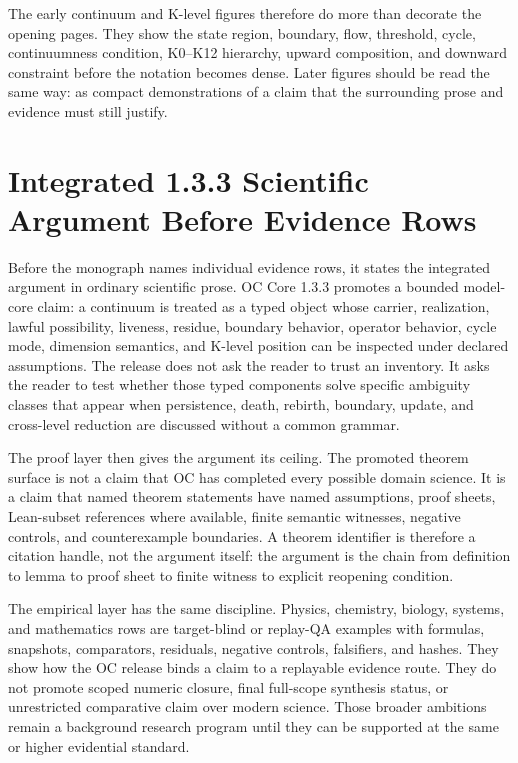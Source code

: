The early continuum and K-level figures therefore do more than decorate the opening pages. They show the state region, boundary, flow, threshold, cycle, continuumness condition, K0--K12 hierarchy, upward composition, and downward constraint before the notation becomes dense. Later figures should be read the same way: as compact demonstrations of a claim that the surrounding prose and evidence must still justify.


\section{Integrated 1.3.3 Scientific Argument Before Evidence Rows}
\label{sec:oc133-integrated-argument-before-evidence-rows}
Before the monograph names individual evidence rows, it states the integrated argument in ordinary scientific prose. OC Core 1.3.3 promotes a bounded model-core claim: a continuum is treated as a typed object whose carrier, realization, lawful possibility, liveness, residue, boundary behavior, operator behavior, cycle mode, dimension semantics, and K-level position can be inspected under declared assumptions. The release does not ask the reader to trust an inventory. It asks the reader to test whether those typed components solve specific ambiguity classes that appear when persistence, death, rebirth, boundary, update, and cross-level reduction are discussed without a common grammar.

The proof layer then gives the argument its ceiling. The promoted theorem surface is not a claim that OC has completed every possible domain science. It is a claim that named theorem statements have named assumptions, proof sheets, Lean-subset references where available, finite semantic witnesses, negative controls, and counterexample boundaries. A theorem identifier is therefore a citation handle, not the argument itself: the argument is the chain from definition to lemma to proof sheet to finite witness to explicit reopening condition.

The empirical layer has the same discipline. Physics, chemistry, biology, systems, and mathematics rows are target-blind or replay-QA examples with formulas, snapshots, comparators, residuals, negative controls, falsifiers, and hashes. They show how the OC release binds a claim to a replayable evidence route. They do not promote scoped numeric closure, final full-scope synthesis status, or unrestricted comparative claim over modern science. Those broader ambitions remain a background research program until they can be supported at the same or higher evidential standard.

